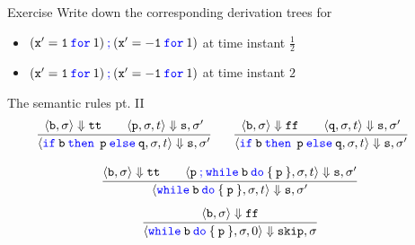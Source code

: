 \documentclass{beamer}
\newcommand{\blue}[1]{\textcolor{blue}{#1}}
\begin{document}
\begin{frame}{Exercise}
        Write down the corresponding derivation trees for
        \begin{itemize}
                \item $(\mathtt{x' = 1} \> \mathtt{\blue{for}} \> 1) \>
                        \blue{\mathtt{;}} \> (\mathtt{x' = -1} \> \mathtt{\blue{for}} \> 1)$
                        at time instant $\frac{1}{2}$
                \item $(\mathtt{x' = 1} \> \mathtt{\blue{for}} \> 1) \>
                        \blue{\mathtt{;}} \> (\mathtt{x' = -1} \> \mathtt{\blue{for}} \> 1)$ 
                        at time instant $2$
        \end{itemize}
\end{frame} 

\begin{frame}{The semantic rules pt. II}
        \[\hspace{-0.4cm}
                \infer[]{
                        \langle \mathtt{\blue{if} \> b \> \blue{then} \> \> p \> \blue{else} \> q}, 
                        \sigma, t \rangle \Downarrow \mathtt{s}, \sigma'
                }{
                        \langle \mathtt{b}, \sigma \rangle \Downarrow \mathtt{tt} \qquad
                        \langle \mathtt{p}, \sigma, t \rangle \Downarrow \mathtt{s}, \sigma'
                } \hspace{0.5cm} 
                \infer[]{
                        \langle \mathtt{\blue{if} \> b \> \blue{then} \> \> p \> \blue{else} \> q}, 
                        \sigma, t \rangle \Downarrow \mathtt{s}, \sigma'
                }{
                        \langle \mathtt{b}, \sigma \rangle \Downarrow \mathtt{ff} \qquad
                        \langle \mathtt{q}, \sigma, t \rangle \Downarrow \mathtt{s}, \sigma'
                } 
        \]

        \[
                \infer[]{
                        \langle \mathtt{\blue{while} \> b \> \blue{do} \> \{ \> p \> \}}, 
                        \sigma, t \rangle \Downarrow \mathtt{s}, \sigma'
                }{
                        \langle \mathtt{b}, \sigma \rangle \Downarrow \mathtt{tt} \qquad
                        \langle \mathtt{\mathtt{p} \> \blue{\mathtt{;}} \> 
                        \blue{while} \> b \> \blue{do} \> \{ \> p \> \}}, \sigma, t
                        \rangle \Downarrow \mathtt{s}, \sigma' 
                }
        \]\vspace{0.001cm}
        \[
                \infer[]{
                        \langle \mathtt{\blue{while} \> b \> \blue{do} \> \{ \> p \> \}}, \sigma 
                        , 0 \rangle \Downarrow \mathtt{skip},\sigma
                }{
                        \langle \mathtt{b}, \sigma \rangle\Downarrow  \mathtt{ff}
                }
        \]
\end{frame}
\end{document}
